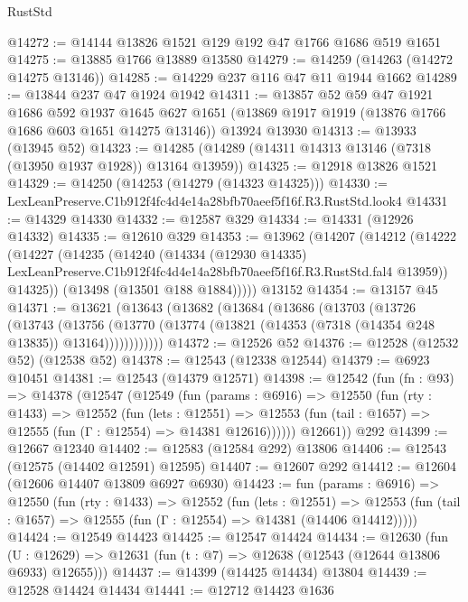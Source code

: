 \begin{lexlean}{RustStd}
\begin{coremodule}
@14272 := @14144 @13826 @1521 @129 @192 @47 @1766 @1686 @519 @1651
@14275 := @13885 @1766 @13889 @13580
@14279 := @14259 (@14263 (@14272 @14275 @13146))
@14285 := @14229 @237 @116 @47 @11 @1944 @1662
@14289 := @13844 @237 @47 @1924 @1942
@14311 := @13857
    @52
    @59
    @47
    @1921
    @1686
    @592
    @1937
    @1645
    @627
    @1651
    (@13869 @1917 @1919 (@13876 @1766 @1686 @603 @1651 @14275 @13146))
    @13924
    @13930
@14313 := @13933 (@13945 @52)
@14323 := @14285 (@14289 (@14311 @14313 @13146 (@7318 (@13950 @1937 @1928)) @13164 @13959))
@14325 := @12918 @13826 @1521
@14329 := @14250 (@14253 (@14279 (@14323 @14325)))
@14330 := LexLeanPreserve.C1b912f4fc4d4e14a28bfb70aeef5f16f.R3.RustStd.look4
@14331 := @14329 @14330
@14332 := @12587 @329
@14334 := @14331 (@12926 @14332)
@14335 := @12610 @329
@14353 := @13962
    (@14207
      (@14212
        (@14222
          (@14227
            (@14235
              (@14240
                (@14334
                  (@12930 @14335)
                  LexLeanPreserve.C1b912f4fc4d4e14a28bfb70aeef5f16f.R3.RustStd.fal4
                  @13959))
              @14325))
          (@13498 (@13501 @188 @1884)))))
    @13152
@14354 := @13157 @45
@14371 := @13621
    (@13643
      (@13682
        (@13684
          (@13686
            (@13703
              (@13726
                (@13743
                  (@13756
                    (@13770 (@13774 (@13821 (@14353 (@7318 (@14354 @248 @13835)) @13164))))))))))))
@14372 := @12526 @52
@14376 := @12528 (@12532 @52) (@12538 @52)
@14378 := @12543 (@12338 @12544)
@14379 := @6923 @10451
@14381 := @12543 (@14379 @12571)
@14398 := @12542
    (fun (fn : @93) =>
    @14378
      (@12547
        (@12549
          (fun (params : @6916) =>
          @12550
            (fun (rty : @1433) =>
            @12552
              (fun (lets : @12551) =>
              @12553 (fun (tail : @1657) => @12555 (fun (Γ : @12554) => @14381 @12616))))))
        @12661))
    @292
@14399 := @12667 @12340
@14402 := @12583 (@12584 @292) @13806
@14406 := @12543 (@12575 (@14402 @12591) @12595)
@14407 := @12607 @292
@14412 := @12604 (@12606 @14407 @13809 @6927 @6930)
@14423 := fun (params : @6916) =>
  @12550
    (fun (rty : @1433) =>
    @12552
      (fun (lets : @12551) =>
      @12553 (fun (tail : @1657) => @12555 (fun (Γ : @12554) => @14381 (@14406 @14412)))))
@14424 := @12549 @14423
@14425 := @12547 @14424
@14434 := @12630
    (fun (U : @12629) => @12631 (fun (t : @7) => @12638 (@12543 (@12644 @13806 @6933) @12655)))
@14437 := @14399 (@14425 @14434) @13804
@14439 := @12528 @14424 @14434
@14441 := @12712 @14423 @1636

\end{coremodule}
\end{lexlean}

